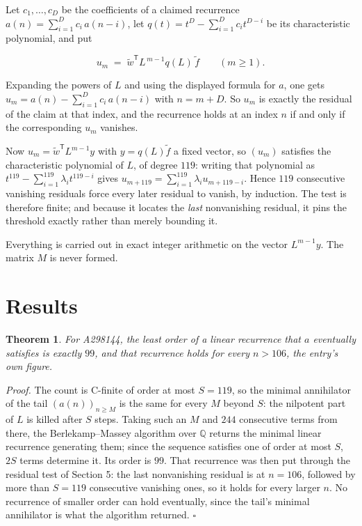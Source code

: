 \documentclass[11pt]{article}
\newtheorem{theorem}{Theorem}
\theoremstyle{definition}
\begin{document}
Let $c_1,\dots,c_D$ be the coefficients of a claimed recurrence $a(n) = \sum_{i=1}^{D} c_i\,a(n-i)$, let $q(t) = t^{D} - \sum_{i=1}^{D} c_i t^{D-i}$ be its characteristic polynomial, and put

\[u_m \;=\; \tilde w^{\mathsf T} L^{\,m-1} q(L)\,\tilde f \qquad (m \ge 1).\]

Expanding the powers of $L$ and using the displayed formula for $a$, one gets $u_m = a(n) - \sum_{i=1}^{D} c_i\,a(n-i)$ with $n = m + D$. So $u_m$ is exactly the residual of the claim at that index, and the recurrence holds at an index $n$ if and only if the corresponding $u_m$ vanishes.

Now $u_m = \tilde w^{\mathsf T} L^{m-1} y$ with $y = q(L)\tilde f$ a fixed vector, so $(u_m)$ satisfies the characteristic polynomial of $L$, of degree $119$: writing that polynomial as $t^{119} - \sum_{i=1}^{119} \lambda_i t^{119-i}$ gives $u_{m+119} = \sum_{i=1}^{119} \lambda_i u_{m+119-i}$. Hence $119$ consecutive vanishing residuals force every later residual to vanish, by induction. The test is therefore finite; and because it locates the {\itshape last} nonvanishing residual, it pins the threshold exactly rather than merely bounding it.

Everything is carried out in exact integer arithmetic on the vector $L^{m-1}y$. The matrix $M$ is never formed.

\section{Results}

\begin{theorem} For A298144, the least order of a linear recurrence that $a$ eventually satisfies is exactly $99$, and that recurrence holds for every $n > 106$, the entry's own figure.\end{theorem}

{\itshape Proof.} The count is C-finite of order at most $S = 119$, so the minimal annihilator of the tail $(a(n))_{n \ge M}$ is the same for every $M$ beyond $S$: the nilpotent part of $L$ is killed after $S$ steps. Taking such an $M$ and $244$ consecutive terms from there, the Berlekamp--Massey algorithm over $\mathbb{Q}$ returns the minimal linear recurrence generating them; since the sequence satisfies one of order at most $S$, $2S$ terms determine it. Its order is $99$. That recurrence was then put through the residual test of Section 5: the last nonvanishing residual is at $n = 106$, followed by more than $S = 119$ consecutive vanishing ones, so it holds for every larger $n$. No recurrence of smaller order can hold eventually, since the tail's minimal annihilator is what the algorithm returned. $\square$
\end{document}

